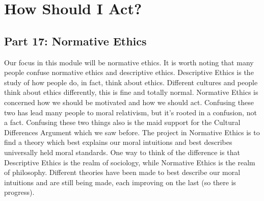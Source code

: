 \part{How Should I Act?}
\label{ch.modeight}
\chapter{Part 17: Normative Ethics}
Our focus in this module will be normative ethics. It is worth noting that many people confuse normative ethics and descriptive ethics. Descriptive Ethics is the study of how people do, in fact, think about ethics. Different cultures and people think about ethics differently, this is fine and totally normal. Normative Ethics is concerned how we should be motivated and how we should act. Confusing these two has lead many people to moral relativism, but it's rooted in a confusion, not a fact. Confusing these two things also is the maid support for the Cultural Differences Argument which we saw before. The project in Normative Ethics is to find a theory which best explains our moral intuitions and best describes universally held moral standards. One way to think of the difference is that Descriptive Ethics is the realm of sociology, while Normative Ethics is the realm of philosophy.  Different theories have been made to best describe our moral intuitions and are still being made, each improving on the last (so there is progress). 
